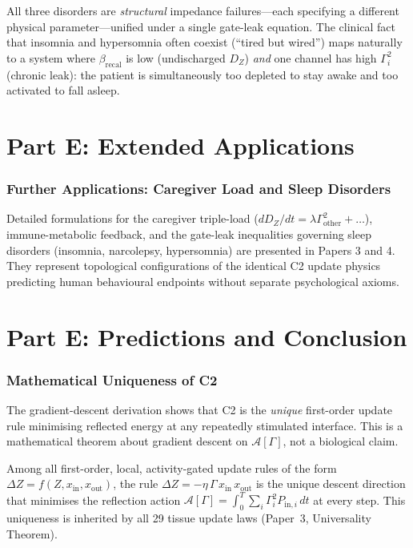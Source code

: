 \documentclass[aps,pre,twocolumn,superscriptaddress,floatfix]{revtex4-2}
\begin{document}
\noindent
All three disorders are \emph{structural} impedance
failures---each specifying a different physical
parameter---unified under a single gate-leak equation.
The clinical fact that insomnia and hypersomnia
often coexist (``tired but wired'') maps naturally
to a system where $\beta_{\text{recal}}$ is low
(undischarged $D_Z$) \emph{and} one channel has
high $\Gamma_i^2$ (chronic leak):
the patient is simultaneously too depleted to stay
awake and too activated to fall asleep.




\part*{Part E: Extended Applications}






\section{Further Applications: Caregiver Load and Sleep Disorders}
Detailed formulations for the caregiver triple-load ($dD_Z/dt = \lambda\Gamma_{\text{other}}^2 + \dots$), immune-metabolic feedback, and the gate-leak inequalities governing sleep disorders (insomnia, narcolepsy, hypersomnia) are presented in Papers 3 and 4. They represent topological configurations of the identical C2 update physics predicting human behavioural endpoints without separate psychological axioms.


\part*{Part E: Predictions and Conclusion}

\section{Mathematical Uniqueness of C2}
\label{sec:c2-unique}

The gradient-descent derivation shows that C2 is the
\emph{unique} first-order update rule minimising reflected
energy at any repeatedly stimulated interface.
This is a mathematical theorem about gradient descent
on $\mathcal{A}[\Gamma]$, not a biological claim.

\begin{theorem}
\label{thm:c2-unique-p5}
Among all first-order, local, activity-gated
update rules of the form
$\Delta Z = f(Z, x_{\text{in}}, x_{\text{out}})$,
the rule $\Delta Z = -\eta\,\Gamma\,x_{\text{in}}\,
x_{\text{out}}$ is the unique descent direction
that minimises the reflection action
$\mathcal{A}[\Gamma] = \int_0^T \sum_i \Gamma_i^2
P_{\text{in},i}\,dt$ at every step.
This uniqueness is inherited by all 29 tissue
update laws (Paper~3, Universality Theorem).
\end{theorem}
\end{document}
